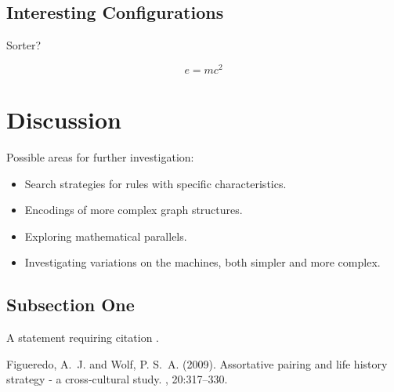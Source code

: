 \documentclass[twoside,twocolumn]{article}
\begin{document}
\subsection{Interesting Configurations}
Sorter?

\begin{equation}
\label{eq:emc}
e = mc^2
\end{equation}


\section{Discussion}

Possible areas for further investigation:

\begin{itemize}
    \item Search strategies for rules with specific characteristics.
    \item Encodings of more complex graph structures.
    \item Exploring mathematical parallels.
    \item Investigating variations on the machines, both simpler and more complex.
\end{itemize}

\subsection{Subsection One}

A statement requiring citation \cite{Figueredo:2009dg}.


\begin{thebibliography}{99} %

Figueredo, A.~J. and Wolf, P. S.~A. (2009).
\newblock Assortative pairing and life history strategy - a cross-cultural
  study.
, 20:317--330.
 
\end{thebibliography}

\end{document}
